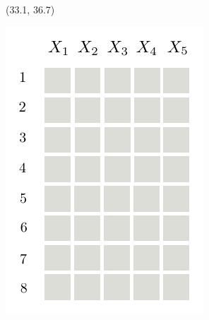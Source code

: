 \documentclass[final]{beamer}
\begin{document}
\begin{frame}{}
  
  \begin{textblock}{25.7}(33.1, 36.7)
    \small
    \begin{minipage}[t][][t]{6.3cm}
      \includegraphics[width=\linewidth]{figures/grid-0}
    \end{minipage}\begin{minipage}[t]{5.54cm}

\end{minipage}
\end{textblock}
\end{frame}
\end{document}
